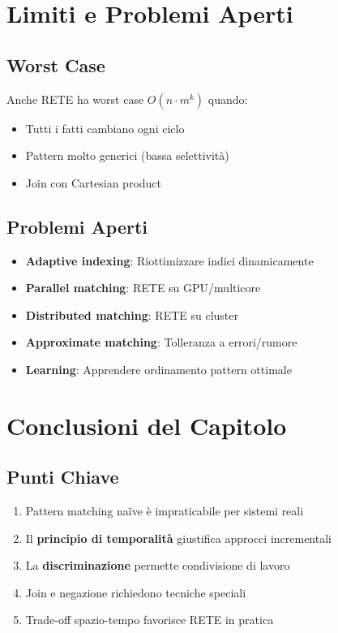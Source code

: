 \section{Limiti e Problemi Aperti}

\subsection{Worst Case}

Anche RETE ha worst case $O(n \cdot m^k)$ quando:
\begin{itemize}
\item Tutti i fatti cambiano ogni ciclo
\item Pattern molto generici (bassa selettività)
\item Join con Cartesian product
\end{itemize}

\subsection{Problemi Aperti}

\begin{itemize}
\item \textbf{Adaptive indexing}: Riottimizzare indici dinamicamente
\item \textbf{Parallel matching}: RETE su GPU/multicore
\item \textbf{Distributed matching}: RETE su cluster
\item \textbf{Approximate matching}: Tolleranza a errori/rumore
\item \textbf{Learning}: Apprendere ordinamento pattern ottimale
\end{itemize}

\section{Conclusioni del Capitolo}

\subsection{Punti Chiave}

\begin{enumerate}
\item Pattern matching naïve è impraticabile per sistemi reali
\item Il \textbf{principio di temporalità} giustifica approcci incrementali
\item La \textbf{discriminazione} permette condivisione di lavoro
\item Join e negazione richiedono tecniche speciali
\item Trade-off spazio-tempo favorisce RETE in pratica
\end{enumerate}

